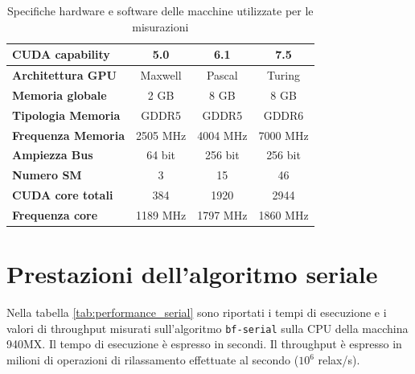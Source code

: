 \documentclass[12pt,a4paper,oneside]{book}
\renewcommand{\arraystretch}{1.1}
\begin{document}
\begin{table}[!ht]
{\begin{tabular}{|l|c|c|c|}
				\textbf{CUDA capability} & 5.0 & 6.1 & 7.5 \\ \hline
				\textbf{Architettura GPU} & Maxwell & Pascal & Turing \\ \hline
				\textbf{Memoria globale} & 2 GB & 8 GB & 8 GB \\ \hline
				\textbf{Tipologia Memoria} & GDDR5 & GDDR5 & GDDR6 \\ \hline
				\textbf{Frequenza Memoria} & 2505 MHz & 4004 MHz & 7000 MHz \\ \hline
				\textbf{Ampiezza Bus} & 64 bit & 256 bit & 256 bit \\ \hline
				\textbf{Numero SM} & 3 & 15 & 46 \\ \hline
				\textbf{CUDA core totali} & 384 & 1920 & 2944 \\ \hline
				\textbf{Frequenza core} & 1189 MHz & 1797 MHz & 1860 MHz \\ \hline
			\end{tabular}
		}
		\caption{Specifiche hardware e software delle macchine utilizzate per le misurazioni}
		\label{tab:specs}
	\end{table}
	\renewcommand{\arraystretch}{1.1}

	\section{Prestazioni dell'algoritmo seriale}
	Nella tabella \ref{tab:performance_serial} sono riportati i tempi di esecuzione e i valori di throughput misurati sull'algoritmo \texttt{bf-serial} sulla CPU della macchina 940MX. Il tempo di esecuzione è espresso in secondi. Il throughput è espresso in milioni di operazioni di rilassamento effettuate al secondo ($10^6$ relax/s).
	
\end{document}
